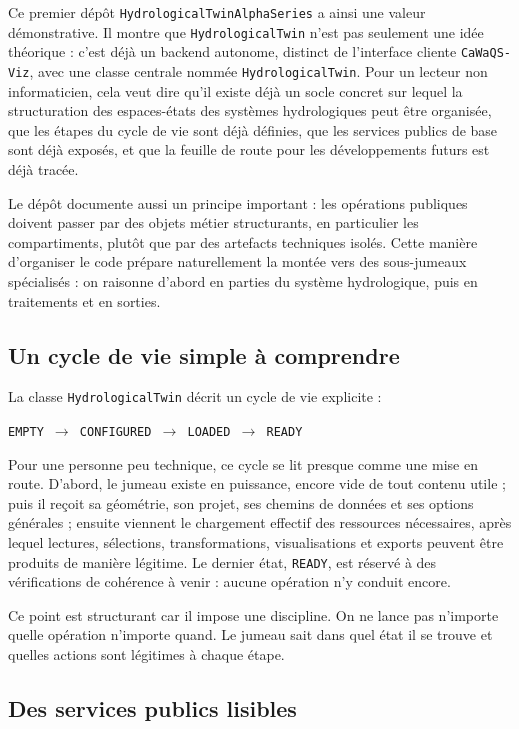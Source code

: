 \documentclass[11pt,a4paper]{article}
\newcommand{\hydrot}{\texttt{HydrologicalTwin}}
\newcommand{\alphaht}{\texttt{HydrologicalTwinAlphaSeries}}
\newcommand{\cwv}{\texttt{CaWaQS-Viz}}
\begin{document}
Ce premier dépôt \alphaht{} a ainsi une valeur démonstrative. Il montre que \hydrot{} n'est pas seulement une idée théorique : c'est déjà un backend autonome, distinct de l'interface cliente \cwv, avec une classe centrale nommée \texttt{HydrologicalTwin}. Pour un lecteur non informaticien, cela veut dire qu'il existe déjà un socle concret sur lequel la structuration des espaces-états des systèmes hydrologiques peut être organisée, que les étapes du cycle de vie sont déjà définies, que les services publics de base sont déjà exposés, et que la feuille de route pour les développements futurs est déjà tracée.

Le dépôt documente aussi un principe important : les opérations publiques doivent passer par des objets métier structurants, en particulier les compartiments, plutôt que par des artefacts techniques isolés. Cette manière d'organiser le code prépare naturellement la montée vers des sous-jumeaux spécialisés : on raisonne d'abord en parties du système hydrologique, puis en traitements et en sorties.

\subsection{Un cycle de vie simple à comprendre}

La classe \hydrot{} décrit un cycle de vie explicite :

\begin{center}
\texttt{EMPTY $\rightarrow$ CONFIGURED $\rightarrow$ LOADED $\rightarrow$ READY}
\end{center}

Pour une personne peu technique, ce cycle se lit presque comme une mise en route. D'abord, le jumeau existe en puissance, encore vide de tout contenu utile ; puis il reçoit sa géométrie, son projet, ses chemins de données et ses options générales ; ensuite viennent le chargement effectif des ressources nécessaires, après lequel lectures, sélections, transformations, visualisations et exports peuvent être produits de manière légitime. Le dernier état, \texttt{READY}, est réservé à des vérifications de cohérence à venir : aucune opération n'y conduit encore.

Ce point est structurant car il impose une discipline. On ne lance pas n'importe quelle opération n'importe quand. Le jumeau sait dans quel état il se trouve et quelles actions sont légitimes à chaque étape.

\subsection{Des services publics lisibles}
\end{document}
